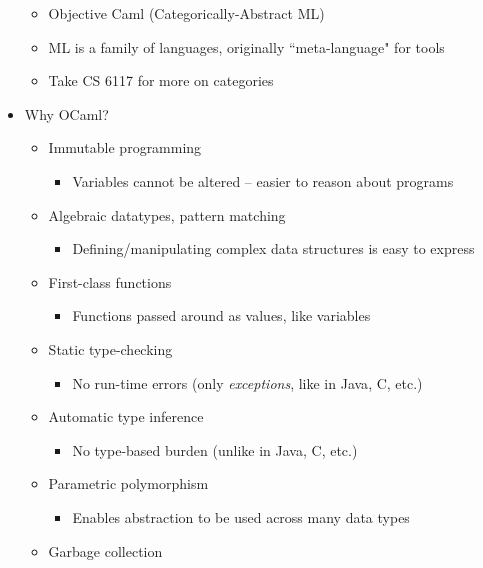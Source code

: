 \begin{itemize}
\begin{itemize}
        \item Objective Caml (Categorically-Abstract \textsf{ML})
        \item \textsf{ML} is a family of languages, originally ``meta-language" for tools
        \item Take CS 6117 for more on categories
    \end{itemize}
    \item Why \textsf{OCaml}?
    \begin{itemize}
        \item Immutable programming
        \begin{itemize}
            \item Variables cannot be altered -- easier to reason about programs
        \end{itemize}
        \item Algebraic datatypes, pattern matching
        \begin{itemize}
            \item Defining/manipulating complex data structures is easy to express
        \end{itemize}
        \item First-class functions
        \begin{itemize}
            \item Functions passed around as values, like variables
        \end{itemize}
        \item Static type-checking
        \begin{itemize}
            \item No run-time errors (only \textit{exceptions}, like in \textsf{Java}, \textsf{C}, etc.)
        \end{itemize}
        \item Automatic type inference
        \begin{itemize}
            \item No type-based burden (unlike in \textsf{Java}, \textsf{C}, etc.)
        \end{itemize}
        \item Parametric polymorphism
        \begin{itemize}
            \item Enables abstraction to be used across many data types
        \end{itemize}
        \item Garbage collection
        \begin{itemize}

\end{itemize}
\end{itemize}
\end{itemize}
